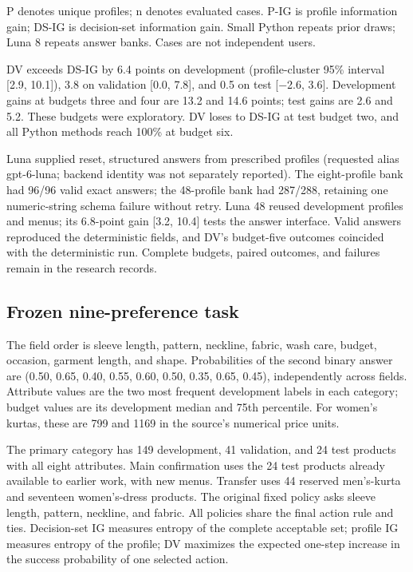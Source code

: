 \documentclass[sigconf,anonymous,review]{acmart}
\begin{document}
P denotes unique profiles; n denotes evaluated cases. P-IG is profile information gain; DS-IG is decision-set information gain. Small Python repeats prior draws; Luna 8 repeats answer banks. Cases are not independent users.


DV exceeds DS-IG by 6.4 points on development (profile-cluster 95\% interval [2.9, 10.1]), 3.8 on validation [0.0, 7.8], and 0.5 on test [$-$2.6, 3.6]. Development gains at budgets three and four are 13.2 and 14.6 points; test gains are 2.6 and 5.2. These budgets were exploratory. DV loses to DS-IG at test budget two, and all Python methods reach 100\% at budget six.


Luna supplied reset, structured answers from prescribed profiles (requested alias gpt-6-luna; backend identity was not separately reported). The eight-profile bank had 96/96 valid exact answers; the 48-profile bank had 287/288, retaining one numeric-string schema failure without retry. Luna 48 reused development profiles and menus; its 6.8-point gain [3.2, 10.4] tests the answer interface. Valid answers reproduced the deterministic fields, and DV's budget-five outcomes coincided with the deterministic run. Complete budgets, paired outcomes, and failures remain in the research records.
\subsection*{Frozen nine-preference task}
The field order is sleeve length, pattern, neckline, fabric, wash care, budget, occasion, garment length, and shape. Probabilities of the second binary answer are (0.50, 0.65, 0.40, 0.55, 0.60, 0.50, 0.35, 0.65, 0.45), independently across fields. Attribute values are the two most frequent development labels in each category; budget values are its development median and 75th percentile. For women's kurtas, these are 799 and 1169 in the source's numerical price units.


The primary category has 149 development, 41 validation, and 24 test products with all eight attributes. Main confirmation uses the 24 test products already available to earlier work, with new menus. Transfer uses 44 reserved men's-kurta and seventeen women's-dress products. The original fixed policy asks sleeve length, pattern, neckline, and fabric. All policies share the final action rule and ties. Decision-set IG measures entropy of the complete acceptable set; profile IG measures entropy of the profile; DV maximizes the expected one-step increase in the success probability of one selected action.
\end{document}
